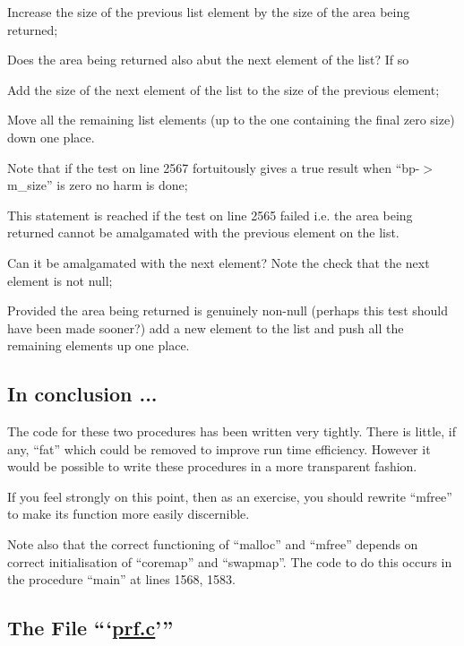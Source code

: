 \item [2566:] Increase the size of the previous
list element by the size of the
area being returned;

\item[2567:] Does the area being returned also
 abut the next element of the
 list? If so

\item[2568:] Add the size of the next element
 of the list to the size of the
 previous element;

\item[2569:] Move all the remaining list elements (up to the one containing
 the final zero size) down one
 place.
 
 Note that if the test on line
 2567 fortuitously gives a true
 result when ``bp-$>$m\_size'' is zero
 no harm is done;

\item[2576:] This statement is reached if the
 test on line 2565 failed i.e. the
 area being returned cannot be
 amalgamated with the previous
 element on the list.

 Can it be amalgamated with the
 next element? Note the check that
 the next element is not null;

\item[2579:] Provided the area being returned
 is genuinely non-null (perhaps
 this test should have been made
 sooner?) add a new element to the
 list and push all the remaining
 elements up one place.
\ed


\subsection{In conclusion ...}

The code for these two procedures has
been written very tightly. There is
little, if any, ``fat'' which could be
removed to improve run time efficiency.
However it would be possible to write
these procedures in a more transparent
fashion.


If you feel strongly on this point,
then as an exercise, you should rewrite
``mfree'' to make its function more
easily discernible.

Note also that the correct functioning
of ``malloc'' and ``mfree'' depends on
correct initialisation of ``coremap'' and
``swapmap''. The code to do this occurs
in the procedure ``main'' at lines 1568,
1583.


\subsection{The File ```\href{./v6/ken/prf.c}{prf.c}'''}

